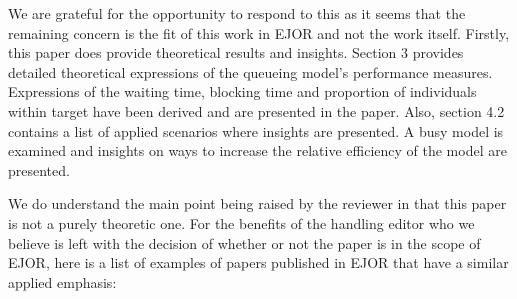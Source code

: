 \documentclass{article}
\begin{document}
    We are grateful for the opportunity to respond to this as it seems that the 
    remaining concern is the fit of this work in EJOR and not the work itself.
    Firstly, this paper does provide theoretical results
    and insights.
    Section 3 provides detailed theoretical expressions of the queueing model's
    performance measures.
    Expressions of the waiting time, blocking time and proportion of
    individuals within target have been derived and are presented in the paper.
    Also, section 4.2 contains a list of applied scenarios where insights 
    are presented.
    A busy model is examined and insights on ways to increase the relative
    efficiency of the model are presented.

    We do understand the main point being raised by the reviewer in that this
    paper is not a purely theoretic one.
    For the benefits of the handling editor who we believe is left with the
    decision of whether or not the paper is in the scope of EJOR, here is a
    list of examples of papers published in EJOR that have a similar applied
    emphasis:
\end{document}
